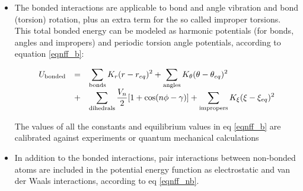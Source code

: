 \documentclass[a4paper,12pt]{article}
\begin{document}
\begin{itemize}
\item The bonded interactions are applicable to bond and angle vibration and bond (torsion) rotation, plus an extra term for the so called improper torsions. This total bonded energy can be modeled as harmonic potentials (for bonds, angles and impropers) and periodic torsion angle potentials, according to equation \ref {eqnff_b}:


\begin{equation}
\begin{array}{lll}
 U_{\rm bonded} &=&\displaystyle \sum_{\rm bonds} K_r (r - r_{eq})^2
                     + \sum_{\rm angles} K_\theta (\theta - \theta_{eq})^2 \\
                     &+&\displaystyle \sum_{\rm dihedrals} { \frac{V_n}{2} }
                                       [1 + {\rm cos}(n\phi - \gamma)]
                     + \sum_{\rm impropers} K_\xi (\xi - \xi_{eq})^2 
\end{array}
\label {eqnff_b}
\end{equation}


The values of all the constants and equilibrium values in eq \ref {eqnff_b} are calibrated against experiments or quantum mechanical calculations %
\item In addition to the bonded interactions, pair interactions between non-bonded atoms are included in the potential energy function as electrostatic and van der Waals interactions, according to eq \ref {eqnff_nb}.


\end{itemize}
\end{document}
